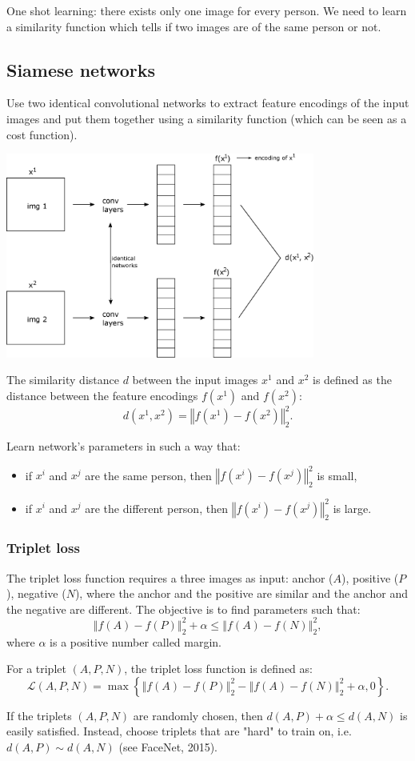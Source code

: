 \documentclass[a4paper,11pt]{report}
\newcommand{\norm}[1]{\left\Vert#1\right\Vert}
\begin{document}
One shot learning: there exists only one image for every person. We need to learn a similarity function which tells if two images are of the same person or not. 

\subsection*{Siamese networks}

Use two identical convolutional networks to extract feature encodings of the input images and put them together using a similarity function (which can be seen as a cost function).

\begin{center}
\includegraphics[width = 4in]{convolutions/siamese}
\end{center}

The similarity distance $d$ between the input images $x^1$ and $x^2$ is defined as the distance between the feature encodings $f(x^1)$ and $f(x^2)$: $$ d(x^1, x^2) = \norm{f(x^1) - f(x^2)}_2^2.$$

Learn network's parameters in such a way that:
\begin{itemize}
  \item if $x^i$ and $x^j$ are the same person, then $\norm{f(x^i) - f(x^j)}_2^2$ is small,
  \item if $x^i$ and $x^j$ are the different person, then $\norm{f(x^i) - f(x^j)}_2^2$ is large.
\end{itemize}

\subsubsection*{Triplet loss}

The triplet loss function requires a three images as input: anchor ($A$), positive ($P$), negative ($N$), where the anchor and the positive are similar and the anchor and the negative are different. The
objective is to find parameters such that: 
$$ \norm{f(A) - f(P)}_2^2 + \alpha \le \norm{f(A) - f(N)}_2^2,$$
where $\alpha$ is a positive number called margin. 

For a triplet $(A, P, N)$, the triplet loss function is defined as: 
$$ \mathcal{L}(A, P, N) = \max\left\{ \norm{f(A) - f(P)}_2^2 - \norm{f(A) - f(N)}_2^2 + \alpha, 0 \right\}.$$

If the triplets $(A, P, N)$ are randomly chosen, then $d(A, P) + \alpha \le d(A, N)$ is easily satisfied. Instead, choose triplets that are "hard" to train on, i.e. $d(A, P) \sim d(A, N)$ (see FaceNet, 2015).  
\end{document}

